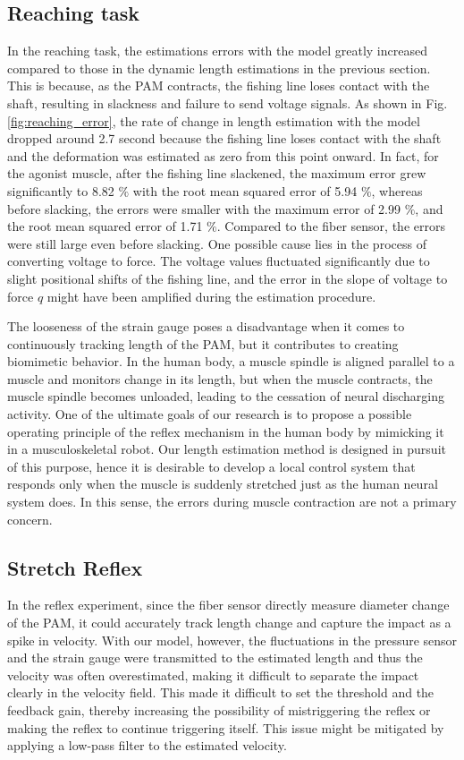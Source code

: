 \subsection{Reaching task}
In the reaching task, the estimations errors with the model greatly increased compared to those in the dynamic length estimations in the previous section. This is because, as the PAM contracts, the fishing line loses contact with the shaft, resulting in slackness and failure to send voltage signals. As shown in Fig.\ref{fig:reaching_error}, the rate of change in length estimation with the model dropped around 2.7 second because the fishing line loses contact with the shaft and the deformation was estimated as zero from this point onward. In fact, for the agonist muscle, after the fishing line slackened, the maximum error grew significantly to 8.82 $\%$ with the root mean squared error of 5.94 $\%$, whereas before slacking, the errors were smaller with the maximum error of 2.99 $\%$, and the root mean squared error of 1.71 $\%$. Compared to the fiber sensor, the errors were still large even before slacking. One possible cause lies in the process of converting voltage to force. The voltage values fluctuated significantly due to slight positional shifts of the fishing line, and the error in the slope of voltage to force $q$ might have been amplified during the estimation procedure.

The looseness of the strain gauge poses a disadvantage when it comes to continuously tracking length of the PAM, but it contributes to creating biomimetic behavior. In the human body, a muscle spindle is aligned parallel to a muscle and monitors change in its length, but when the muscle contracts, the muscle spindle becomes unloaded, leading to the cessation of neural discharging activity\cite{spindle}. One of the ultimate goals of our research is to propose a possible operating principle of the reflex mechanism in the human body by mimicking it in a musculoskeletal robot. Our length estimation method is designed in pursuit of this purpose, hence it is desirable to develop a local control system that responds only when the muscle is suddenly stretched just as the human neural system does. In this sense, the errors during muscle contraction are not a primary concern.

\subsection{Stretch Reflex}
In the reflex experiment, since the fiber sensor directly measure diameter change of the PAM, it could accurately track length change and capture the impact as a spike in velocity. With our model, however, the fluctuations in the pressure sensor and the strain gauge were transmitted to the estimated length and thus the velocity was often overestimated, making it difficult to separate the impact clearly in the velocity field. This made it difficult to set the threshold and the feedback gain, thereby increasing the possibility of mistriggering the reflex or making the reflex to continue triggering itself. This issue might be mitigated by applying a low-pass filter to the estimated velocity.

